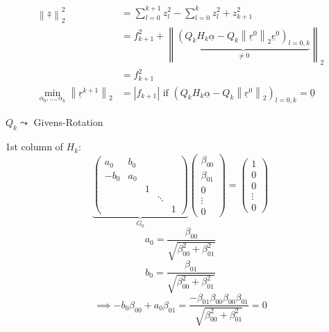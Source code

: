 \documentclass{article}
\newcommand{\abs}[1]{\left|#1\right|}
\newcommand{\norm}[1]{\left\|#1\right\|}
\begin{document}
\begin{align*}
  \norm{\underline z}_2^2 &= \sum_{l=0}^{k+1} z_l^2 - \sum_{l=0}^k z_l^2 + z_{k+1}^2 \\
    &= f_{k+1}^2 + \norm{\underbrace{\left(Q_k H_k \underline \alpha - Q_k \norm{\underline r^0}_2 \underline e^0\right)_{l=0,k}}_{\neq 0}}_2 \\
    &= f_{k+1}^2 \\
  \min_{\alpha_0,\ldots,\alpha_k} \norm{\underline r^{k+1}}_2 &= \abs{f_{k+1}} \text{ if } \left(Q_k H_k \underline \alpha - Q_k \norm{\underline r^0}_2\right)_{l=0,k} = \underline 0
\end{align*}

$Q_k \leadsto$ Givens-Rotation

1st column of $H_k$:
\[
  \underbrace{\begin{pmatrix}
    a_0 & b_0 &    &        & \\
    -b_0 & a_0 &   &        & \\
        &     & 1  &        & \\
        &     &    & \ddots & \\
        &     &    &        & 1
  \end{pmatrix}}_{G_0}
  \begin{pmatrix} \beta_{00} \\ \beta_{01} \\ 0 \\ \vdots \\ 0 \end{pmatrix}
  =
  \begin{pmatrix} 1 \\ 0 \\ 0 \\ \vdots \\ 0 \end{pmatrix}
\]
\[ a_0 = \frac{\beta_{00}}{\sqrt{\beta_{00}^2 + \beta_{01}^2}} \]
\[ b_0 = \frac{\beta_{01}}{\sqrt{\beta_{00}^2 + \beta_{01}^2}} \]
\[ \implies -b_0 \beta_{00} + a_0 \beta_{01} = \frac{-\beta_{01} \beta_{00} \beta_{00} \beta_{01}}{\sqrt{\beta_{00}^2 + \beta_{01}^2}} = 0 \]
\end{document}
